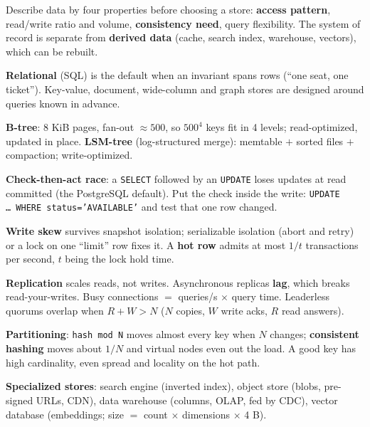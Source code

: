 \stages{\stDesign\ \stEstimate\ \stDeep}

\begin{know}
  \item Describe data by four properties before choosing a store: \textbf{access pattern}, read/write ratio and volume, \textbf{consistency need}, query flexibility. The system of record is separate from \textbf{derived data} (cache, search index, warehouse, vectors), which can be rebuilt.
  \item \textbf{Relational} (SQL) is the default when an invariant spans rows (``one seat, one ticket''). Key-value, document, wide-column and graph stores are designed around queries known in advance.
  \item \textbf{B-tree}: 8 KiB pages, fan-out $\approx 500$, so $500^4$ keys fit in 4 levels; read-optimized, updated in place. \textbf{LSM-tree} (log-structured merge): memtable $+$ sorted files $+$ compaction; write-optimized.
  \item \textbf{Check-then-act race}: a \texttt{SELECT} followed by an \texttt{UPDATE} loses updates at read committed (the PostgreSQL default). Put the check inside the write: \texttt{UPDATE \dots\ WHERE status='AVAILABLE'} and test that one row changed.
  \item \textbf{Write skew} survives snapshot isolation; serializable isolation (abort and retry) or a lock on one ``limit'' row fixes it. A \textbf{hot row} admits at most $1/t$ transactions per second, $t$ being the lock hold time.
  \item \textbf{Replication} scales reads, not writes. Asynchronous replicas \textbf{lag}, which breaks read-your-writes. Busy connections $=$ queries/s $\times$ query time. Leaderless quorums overlap when $R + W > N$ ($N$ copies, $W$ write acks, $R$ read answers).
  \item \textbf{Partitioning}: \texttt{hash mod N} moves almost every key when $N$ changes; \textbf{consistent hashing} moves about $1/N$ and virtual nodes even out the load. A good key has high cardinality, even spread and locality on the hot path.
  \item \textbf{Specialized stores}: search engine (inverted index), object store (blobs, pre-signed URLs, CDN), data warehouse (columns, OLAP, fed by CDC), vector database (embeddings; size $=$ count $\times$ dimensions $\times$ 4 B).
\end{know}

